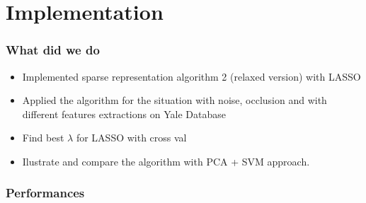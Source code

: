 \documentclass{beamer}
\begin{document}
\section{Implementation}


\begin{frame}

		\frametitle{What did we do}
		
		\begin{itemize}
		\item Implemented sparse representation algorithm 2 (relaxed version) with LASSO
		\item Applied the algorithm for the situation with noise, occlusion and with different features extractions on Yale Database
		\item Find best $\lambda$ for LASSO with cross val
		\item Ilustrate and compare the algorithm with PCA + SVM approach.
		
		\end{itemize}
		
		
\end{frame}
		


\begin{frame}

		\frametitle{Performances}

		
		
\end{frame}
		




\end{document}
